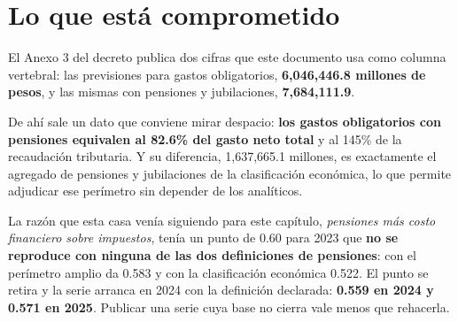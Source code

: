 \section{Lo que está comprometido}

El Anexo 3 del decreto publica dos cifras que este documento usa como columna
vertebral: las previsiones para gastos obligatorios, \textbf{6,046,446.8 millones
de pesos}, y las mismas con pensiones y jubilaciones, \textbf{7,684,111.9}.

De ahí sale un dato que conviene mirar despacio: \textbf{los gastos obligatorios
con pensiones equivalen al 82.6\% del gasto neto total} y al 145\% de la
recaudación tributaria. Y su diferencia, 1,637,665.1 millones, es exactamente el
agregado de pensiones y jubilaciones de la clasificación económica, lo que permite
adjudicar ese perímetro sin depender de los analíticos.

La razón que esta casa venía siguiendo para este capítulo, \emph{pensiones más
costo financiero sobre impuestos}, tenía un punto de 0.60 para 2023 que
\textbf{no se reproduce con ninguna de las dos definiciones de pensiones}: con el
perímetro amplio da 0.583 y con la clasificación económica 0.522. El punto se
retira y la serie arranca en 2024 con la definición declarada: \textbf{0.559 en
2024 y 0.571 en 2025}. Publicar una serie cuya base no cierra vale menos que
rehacerla.

\clearpage
